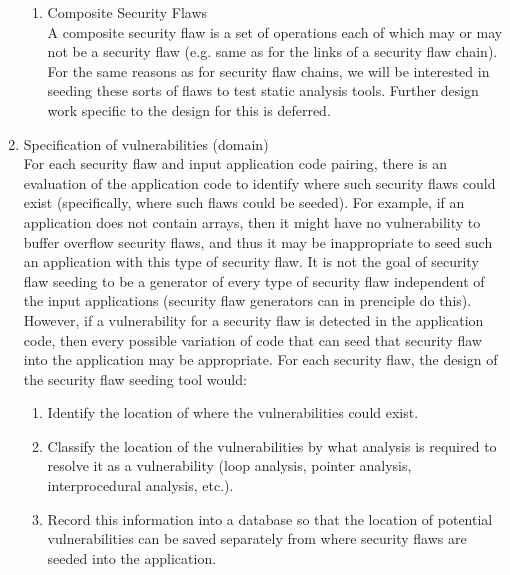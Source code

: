 \begin{enumerate}
\begin{enumerate}
         \item Composite Security Flaws \\
               A composite security flaw is a set of operations each of which may or 
               may not be a security flaw (e.g. same as for the links of a security flaw
               chain).  For the same reasons as for security flaw chains, we will be
               interested in seeding these sorts of flaws to test static analysis tools.
               Further design work specific to the design for this is deferred.
      \end{enumerate}

   \item Specification of vulnerabilities (domain) \\
         \label{item:SpecificationOfVulnerabilities}
         For each security flaw and input application code pairing, there is an evaluation of
         the application code to identify where such security flaws could exist
         (specifically, where such flaws could be seeded).  For example, if
         an application does not contain arrays, then it might have no vulnerability
         to buffer overflow security flaws, and thus it may be inappropriate to seed 
         such an application with this type of security flaw.  It is not the goal
         of security flaw seeding to be a generator of every type of security flaw
         independent of the input applications (security flaw generators can in prenciple
         do this).  However, if a vulnerability for a security flaw is detected in the 
         application code, then every possible variation of code that can seed that
         security flaw into the application may be appropriate. For each security flaw,
         the design of the security flaw seeding tool would:
            \begin{enumerate}
               \item Identify the location of where the vulnerabilities could exist.
               \item Classify the location of the vulnerabilities by what analysis is
                     required to resolve it as a vulnerability (loop analysis, pointer
                     analysis, interprocedural analysis, etc.).
               \item Record this information into a database so that the location of
                     potential vulnerabilities can be saved separately from where
                     security flaws are seeded into the application.
            \end{enumerate}


\end{enumerate}
